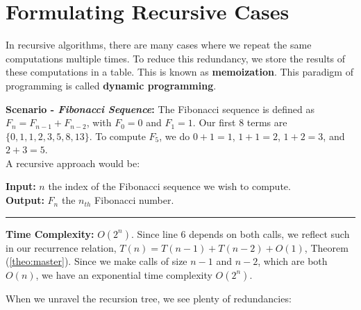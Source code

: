 \section{Formulating Recursive Cases}

\begin{Def}

In recursive algorithms, there are many cases where we repeat
the same computations multiple times. To reduce this redundancy, we store
the results of these computations in a table. This is known as \textbf{memoization}. This paradigm of programming is
called \textbf{dynamic programming}.
\end{Def}
\textbf{Scenario - \textit{Fibonacci Sequence}:} The Fibonacci sequence is defined as $F_n=F_{n-1}+F_{n-2}$, with $F_0=0$ and $F_1=1$. Our
first 8 terms are $\{0,1,1,2,3,5,8,13\}$. To compute $F_5$, we do $0+1=1$, $1+1=2$, $1+2=3$, and $2+3=5$.\\

\noindent
A recursive approach would be:

\begin{Func}
    \noindent
    \textbf{Input:} $n$ the index of the Fibonacci sequence we wish to compute.\\
    \textbf{Output:} $F_n$ the $n_{th}$ Fibonacci number.\\

    \vspace{-.5em}
    \begin{algorithm}[H]
        \SetAlgoLined
    \end{algorithm}
    \noindent
    \rule{\textwidth}{0.4pt}
    \textbf{Time Complexity:} $O(2^n)$. Since line 6 depends on both calls, we reflect such in our recurrence relation, $T(n)=T(n-1)+T(n-2)+O(1)$, Theorem (\ref{theo:master}). Since we make
    calls of size $n-1$ and $n-2$, which are both $O(n)$, we have an exponential time complexity $O(2^n)$.
\end{Func}

\newpage
\noindent
When we unravel the recursion tree, we see plenty of redundancies:

